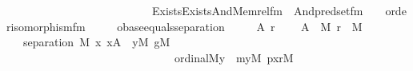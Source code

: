 \begin{isabellebody}
\ \ \ \ \ \ \ \ \ \ \ \ \ \ \ \ \ \ \ \ \ \ \ \ \ \ Exists{\isacharparenleft}{\kern0pt}Exists{\isacharparenleft}{\kern0pt}And{\isacharparenleft}{\kern0pt}Memrel{\isacharunderscore}{\kern0pt}fm{\isacharparenleft}{\kern0pt}{}{\isacharcomma}{\kern0pt}\ {}{\isacharparenright}{\kern0pt}{\isacharcomma}{\kern0pt}\ And{\isacharparenleft}{\kern0pt}pred{\isacharunderscore}{\kern0pt}set{\isacharunderscore}{\kern0pt}fm{\isacharparenleft}{\kern0pt}{}{\isacharcomma}{\kern0pt}\ {}{\isacharcomma}{\kern0pt}\ {}{\isacharcomma}{\kern0pt}\ {}{\isacharparenright}{\kern0pt}{\isacharcomma}{\kern0pt}\ order{\isacharunderscore}{\kern0pt}isomorphism{\isacharunderscore}{\kern0pt}fm{\isacharparenleft}{\kern0pt}{}{\isacharcomma}{\kern0pt}\ {}{\isacharcomma}{\kern0pt}\ {}{\isacharcomma}{\kern0pt}\ {}{\isacharcomma}{\kern0pt}\ {}{\isacharparenright}{\kern0pt}{\isacharparenright}{\kern0pt}{\isacharparenright}{\kern0pt}{\isacharparenright}{\kern0pt}{\isacharparenright}{\kern0pt}{\isacharparenright}{\kern0pt}{\isacharparenright}{\kern0pt}{\isacharparenright}{\kern0pt}{\isacharparenright}{\kern0pt}{\isacharparenright}{\kern0pt}{\isachardoublequoteclose}\isanewline
\isanewline
{}\isamarkupfalse%
\ obase{\isacharunderscore}{\kern0pt}equals{\isacharunderscore}{\kern0pt}separation\ {\isacharcolon}{\kern0pt}\ \isanewline
\ \ \ A\ r\ \isanewline
\ \ \ {\isachardoublequoteopen}A\ {\isasymin}\ M{\isachardoublequoteclose}\ {\isachardoublequoteopen}r\ {\isasymin}\ M{\isachardoublequoteclose}\ \isanewline
\ \ \ {\isachardoublequoteopen}separation\ {\isacharparenleft}{\kern0pt}{\isacharhash}{\kern0pt}{\isacharhash}{\kern0pt}M{\isacharcomma}{\kern0pt}\ {\isasymlambda}x{\isachardot}{\kern0pt}\ x{\isasymin}A\ {\isasymlongrightarrow}\ {\isasymnot}{\isacharparenleft}{\kern0pt}{\isasymexists}y{\isacharbrackleft}{\kern0pt}{\isacharhash}{\kern0pt}{\isacharhash}{\kern0pt}M{\isacharbrackright}{\kern0pt}{\isachardot}{\kern0pt}\ {\isasymexists}g{\isacharbrackleft}{\kern0pt}{\isacharhash}{\kern0pt}{\isacharhash}{\kern0pt}M{\isacharbrackright}{\kern0pt}{\isachardot}{\kern0pt}\isanewline
\ \ \ \ \ \ \ \ \ \ \ \ \ \ \ \ \ \ \ \ \ \ \ \ \ \ \ \ \ \ ordinal{\isacharparenleft}{\kern0pt}{\isacharhash}{\kern0pt}{\isacharhash}{\kern0pt}M{\isacharcomma}{\kern0pt}y{\isacharparenright}{\kern0pt}\ {\isasymand}\ {\isacharparenleft}{\kern0pt}{\isasymexists}my{\isacharbrackleft}{\kern0pt}{\isacharhash}{\kern0pt}{\isacharhash}{\kern0pt}M{\isacharbrackright}{\kern0pt}{\isachardot}{\kern0pt}\ {\isasymexists}pxr{\isacharbrackleft}{\kern0pt}{\isacharhash}{\kern0pt}{\isacharhash}{\kern0pt}M{\isacharbrackright}{\kern0pt}{\isachardot}{\kern0pt}\isanewline

\end{isabellebody}
